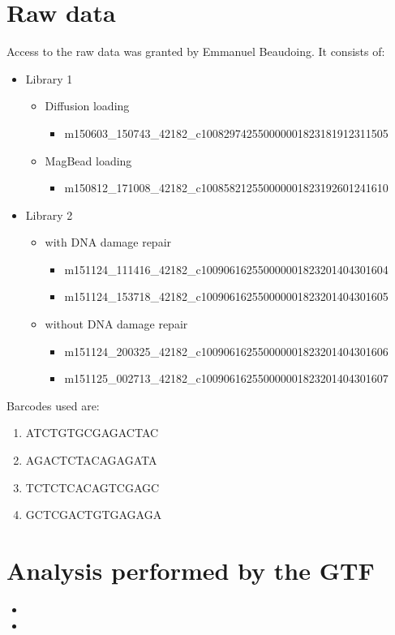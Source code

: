 \documentclass{article}\usepackage[]{graphicx}\usepackage[]{color}
\begin{document}
\section{Raw data}
Access to the raw data was granted by Emmanuel Beaudoing. It consists of:
\begin{itemize}
  \item Library 1
  \begin{itemize}
    \item Diffusion loading
    \begin{itemize}
      \item m150603\_150743\_42182\_c100829742550000001823181912311505
    \end{itemize}
    \item MagBead loading
    \begin{itemize}
      \item m150812\_171008\_42182\_c100858212550000001823192601241610
    \end{itemize}
  \end{itemize}
  \item Library 2
  \begin{itemize}
    \item with DNA damage repair
    \begin{itemize}
      \item m151124\_111416\_42182\_c100906162550000001823201404301604
      \item m151124\_153718\_42182\_c100906162550000001823201404301605
    \end{itemize}
    \item without DNA damage repair
    \begin{itemize}
      \item m151124\_200325\_42182\_c100906162550000001823201404301606
      \item m151125\_002713\_42182\_c100906162550000001823201404301607
    \end{itemize}
  \end{itemize}
\end{itemize}
Barcodes used are:
\begin{enumerate}
  \item ATCTGTGCGAGACTAC
  \item AGACTCTACAGAGATA
  \item TCTCTCACAGTCGAGC
  \item GCTCGACTGTGAGAGA
\end{enumerate}
\section{Analysis performed by the GTF}
\begin{itemize}
  \item 
  \item
\end{itemize}
\end{document}
